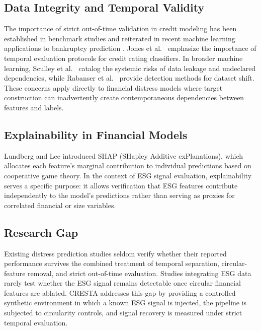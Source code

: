 \documentclass[sigconf,anonymous]{acmart}
\begin{document}
\subsection{Data Integrity and Temporal Validity}
The importance of strict out-of-time validation in credit modeling has been established in benchmark studies \cite{lessmann2015, bellotti2009} and reiterated in recent machine learning applications to bankruptcy prediction \cite{barboza2017}. Jones et al.\ \cite{jones2017} emphasize the importance of temporal evaluation protocols for credit rating classifiers. In broader machine learning, Sculley et al.\ \cite{sculley2015} catalog the systemic risks of data leakage and undeclared dependencies, while Rabanser et al.\ \cite{rabanser2019} provide detection methods for dataset shift. These concerns apply directly to financial distress models where target construction can inadvertently create contemporaneous dependencies between features and labels.

\subsection{Explainability in Financial Models}
Lundberg and Lee \cite{lundberg2017} introduced SHAP (SHapley Additive exPlanations), which allocates each feature's marginal contribution to individual predictions based on cooperative game theory. In the context of ESG signal evaluation, explainability serves a specific purpose: it allows verification that ESG features contribute independently to the model's predictions rather than serving as proxies for correlated financial or size variables.

\subsection{Research Gap}
Existing distress prediction studies seldom verify whether their reported performance survives the combined treatment of temporal separation, circular-feature removal, and strict out-of-time evaluation. Studies integrating ESG data rarely test whether the ESG signal remains detectable once circular financial features are ablated. CRESTA addresses this gap by providing a controlled synthetic environment in which a known ESG signal is injected, the pipeline is subjected to circularity controls, and signal recovery is measured under strict temporal evaluation.


\end{document}
